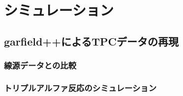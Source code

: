 \chapter{シミュレーション}
\label{chap::simulation}
\section{garfield++によるTPCデータの再現}
\subsection{線源データとの比較}
\subsection{トリプルアルファ反応のシミュレーション}
